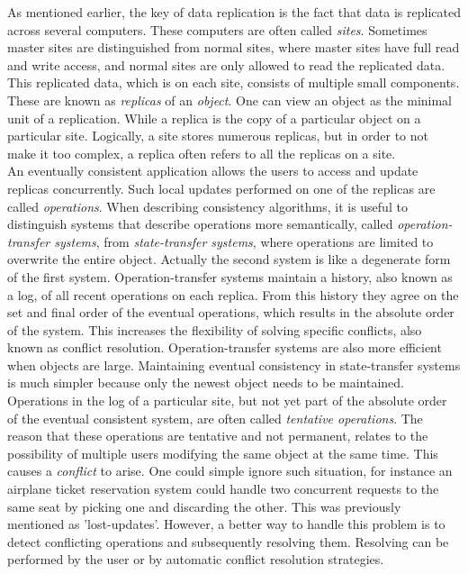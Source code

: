 \documentclass[a4paper,12pt]{report}
\begin{document}
As mentioned earlier, the key of data replication is the fact that data is replicated across several computers. These computers are often called \textit{sites}. Sometimes master sites are distinguished from normal sites, where master sites have full read and write access, and normal sites are only allowed to read the replicated data. This replicated data, which is on each site, consists of multiple small components. These are known as \textit{replicas} of an \textit{object}. One can view an object as the minimal unit of a replication. While a replica is the copy of a particular object on a particular site. Logically, a site stores numerous replicas, but in order to not make it too complex, a replica often refers to all the replicas on a site. \\
\indent An eventually consistent application allows the users to access and update replicas concurrently. Such local updates performed on one of the replicas are called \textit{operations}. When describing consistency algorithms, it is useful to distinguish systems that describe operations more semantically, called \textit{operation-transfer systems}, from \textit{state-transfer systems}, where operations are limited to overwrite the entire object. Actually the second system is like a degenerate form of the first system. Operation-transfer systems maintain a history, also known as a log, of all recent operations on each replica. From this history they agree on the set and final order of the eventual operations, which results in the absolute order of the system. This increases the flexibility of solving specific conflicts, also known as conflict resolution. Operation-transfer systems are also more efficient when objects are large. Maintaining eventual consistency in state-transfer systems is much simpler because only the newest object needs to be maintained. \\
\indent Operations in the log of a particular site, but not yet part of the absolute order of the eventual consistent system, are often called \textit{tentative operations}. The reason that these operations are tentative and not permanent, relates to the possibility of multiple users modifying the same object at the same time. This causes a \textit{conflict} to arise. One could simple ignore such situation, for instance an airplane ticket reservation system could handle two concurrent requests to the same seat by picking one and discarding the other. This was previously mentioned as 'lost-updates'. However, a better way to handle this problem is to detect conflicting operations and subsequently resolving them. Resolving can be performed by the user or by automatic conflict resolution strategies. \\
\end{document}
